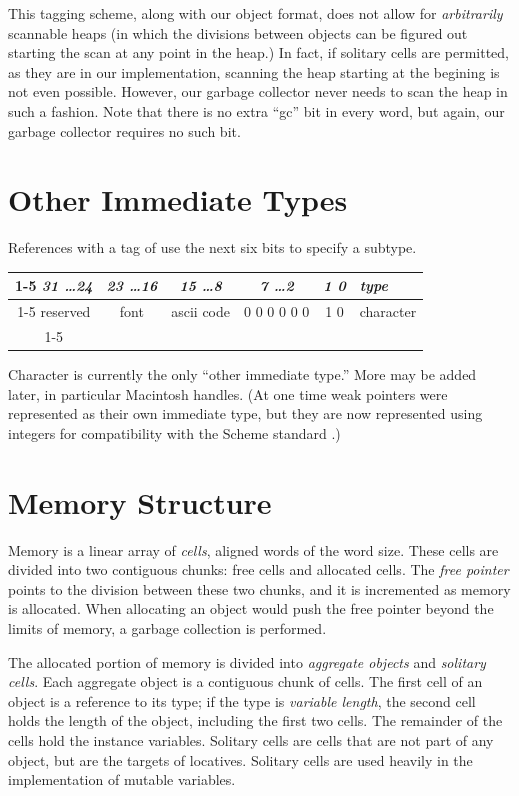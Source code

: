 This tagging scheme, along with our object format, does not allow for
\emph{arbitrarily} scannable heaps (in which the divisions between
objects can be figured out starting the scan at any point in the
heap.)  In fact, if solitary cells are permitted, as they are in our
implementation, scanning the heap starting at the begining is not even
possible.  However, our garbage collector never needs to scan the heap
in such a fashion.  Note that there is no extra ``gc'' bit in every
word, but again, our garbage collector requires no such bit.


\section{Other Immediate Types}

References with a tag of   use the next six bits to
specify a subtype.
\begin{center}
\begin{tabular}{|c|c|c|c|c|l}
\cline{1-5}
\emph{31 \ldots 24} & \emph{23 \ldots 16} & \emph{15 \ldots 8} &
\emph{7 \ldots 2} & \emph{1 0} & \multicolumn{1}{l}{\emph{type}} \\ \cline{1-5}
 reserved & font & ascii code & 0 0 0 0 0 0 & 1 0 & character\\ \cline{1-5}
\end{tabular}
\end{center}
Character is currently the only ``other immediate type.''  More may be
added later, in particular Macintosh handles.  (At one time weak
pointers were represented as their own immediate type, but they are
now represented using integers for compatibility with the Scheme
standard \citep{R3RS}.)


\section{Memory Structure}

Memory is a linear array of \emph{cells}, aligned words of the word
size.  These
cells are divided into two contiguous chunks: free cells and allocated
cells.  The \emph{free pointer} points to the division between these
two chunks, and it is incremented as memory is allocated.  When
allocating an object would push the free pointer beyond the limits of
memory, a garbage collection is performed.

The allocated portion of memory is divided into \emph{aggregate
objects} and \emph{solitary cells}.  Each aggregate object is a
contiguous chunk of cells.  The first cell of an object is a reference
to its type; if the type is \emph{variable length}, the second cell
holds the length of the object, including the first two cells.  The
remainder of the cells hold the instance variables.  Solitary cells
are cells that are not part of any object, but are the targets of
locatives.  Solitary cells are used heavily in the implementation of
mutable variables.

